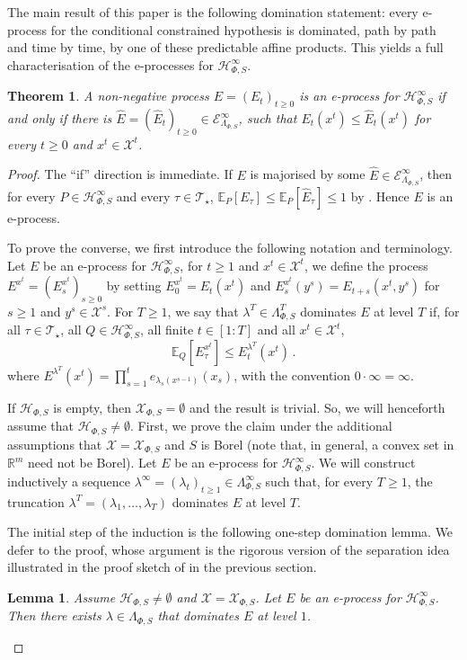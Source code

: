 \documentclass[10pt, a4paper]{article}
\newcommand{\E}{\mathbb E}
\newcommand{\e}{e}
\newcommand{\Ee}{\mathcal E}
\newcommand{\EeP}{\Ee_{\LP}}
\newcommand{\Hh}{\mathcal H}
\newcommand{\HhP}{\Hh_{\Phi,S}}
\newcommand{\LP}{\Lambda_{\Phi,S}}
\newcommand{\R}{\mathbb R}
\newcommand{\T}{\mathcal T}
\newcommand{\X}{\mathcal X}
\newcommand{\XP}{\X_{\Phi,S}}
\newtheorem{lemma}{Lemma}
\newtheorem{theorem}{Theorem}
\begin{document}
The main result of this paper is the following domination statement: every e-process for the conditional constrained hypothesis is dominated, path by path and time by time, by one of these predictable affine products. This yields a full characterisation of the e-processes for $\HhP^\infty$. 

\begin{theorem}\label{thm:eprocess_maj}
    A non-negative process $E = (E_t)_{t\geq 0}$ is an e-process for $\HhP^\infty$ if and only if there is $\hat E = (\hat E_t)_{t\geq 0}\in\EeP^\infty$, such that $E_t(x^t)\leq \hat E_t(x^t)$ for every $t\geq 0$ and  $x^t\in\X^t$. 
\end{theorem}
\begin{proof}
    The ``if'' direction is immediate. If $E$ is majorised by some $\hat E\in\EeP^\infty$, then for every $P\in\HhP^\infty$ and every $\tau\in\T_\star$, $\E_P[E_\tau]\leq \E_P[\hat E_\tau]\leq 1$ by . Hence $E$ is an e-process.

    To prove the converse, we first introduce the following notation and terminology. Let $E$ be an e-process for $\HhP^\infty$, for $t\geq 1$ and $x^t\in\X^t$, we define the process $E^{x^t} = (E_s^{x^t})_{s\geq 0}$ by setting $E_0^{x^t}=E_t(x^t)$ and $E_s^{x^t}(y^s) = E_{t+s}(x^t, y^s)$ for $s\geq 1$ and $y^s\in\X^s$. For $T\geq 1$, we say that $\lambda^T\in\LP^T$ dominates $E$ at level $T$ if, for all $\tau\in\T_\star$, all $Q\in\HhP^\infty$, all finite $t\in[1:T]$ and all $x^t\in\X^t$, 
    \begin{equation}\label{eq:defdom}\E_Q[E_\tau^{x^t}]\leq E^{\lambda^T}_t(x^t)\,.\end{equation} where $E^{\lambda^T}(x^t) = \prod_{s=1}^t \e_{\lambda_s(x^{s-1})}(x_s)$,  with the convention $0\cdot\infty = \infty$.

    If $\HhP$ is empty, then $\XP=\emptyset$ and the result is trivial. So, we will henceforth assume that $\HhP\neq\emptyset$. First, we prove the claim under the additional assumptions that $\X = \XP$ and $S$ is Borel (note that, in general, a convex set in $\R^m$ need not be Borel). Let $E$ be an e-process for $\HhP^\infty$.  We will construct inductively a sequence $\lambda^\infty = (\lambda_t)_{t\geq 1}\in\LP^\infty$ such that, for every $T\geq 1$, the truncation $\lambda^T = (\lambda_1,\dots, \lambda_T)$ dominates $E$ at level $T$. 

    The initial step of the induction is the following one-step domination lemma. We defer to  the proof, whose  argument is the rigorous version of the separation idea illustrated in the proof sketch of  in the previous section.
    \begin{lemma}\label{lemma:dom}
        Assume $\HhP\neq\emptyset$ and $\X=\XP$. Let $E$ be an e-process for $\HhP^\infty$. Then there exists $\lambda\in\LP$ that dominates $E$ at level $1$.
    \end{lemma}
    

\end{proof}
\end{document}
